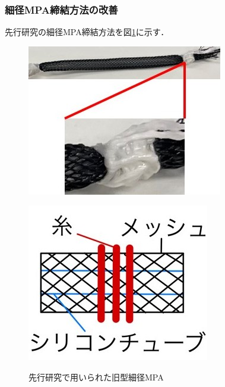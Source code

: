 \subsubsection{細径MPA締結方法の改善}
先行研究の細径MPA締結方法を図\ref{fig:MPA_tanbu_1}に示す．
\begin{figure}
  \begin{minipage}{0.5\hsize}
    \centering  
    \includegraphics[scale=0.6]{image/MPA_tanbu_1_1.jpg}
    \label{fig:MPA_tanbu_1_1}
  \end{minipage}
  \begin{minipage}{0.5\hsize}
    \centering
    \includegraphics[scale=0.6]{image/MPA_tanbu_1_2.jpg}
    \label{fig:MPA_tanbu_1_2}
  \end{minipage}
  \caption{先行研究で用いられた旧型細径MPA}
  \label{fig:MPA_tanbu_1}
\end{figure}
%
